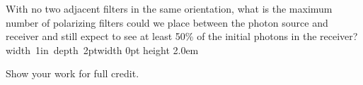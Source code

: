 \documentclass[12pt]{article}
\newcommand{\Blank}{\mbox{\hskip 4pt\vrule width 1in depth 2pt}\vrule width 0pt height 2.0em}
\begin{document}
\begin{enumerate}[font=\bfseries]
    With no two adjacent filters in the same orientation, what is the maximum number of
    polarizing filters could we place between the photon source and receiver and still expect to see at least 50\% of the initial photons in the receiver? \Blank{}
    
    Show your work for full credit.

   
    
\end{enumerate}
\end{document}
